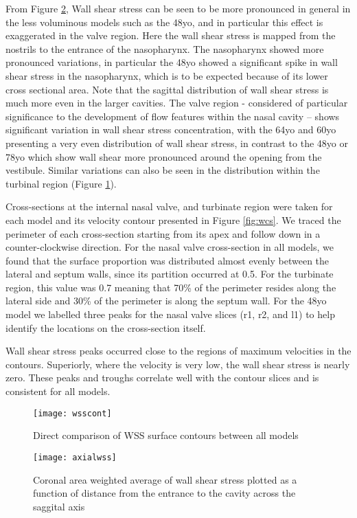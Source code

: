 From Figure \ref{fig:wax}, Wall shear stress can be seen to be more pronounced in general in the less voluminous models such as the 48yo, and in particular this effect is exaggerated in the valve region. Here the wall shear stress is mapped from the nostrils to the entrance of the nasopharynx. The nasopharynx showed more pronounced variations, in particular the 48yo showed a significant spike in wall shear stress in the nasopharynx, which is to be expected because of its lower cross sectional area. Note that the sagittal distribution of wall shear stress is much more even in the larger cavities.  The valve region - considered of particular significance to the development of flow features within the nasal cavity \cite{Lindemann2008} – shows significant variation in wall shear stress concentration, with the 64yo and 60yo presenting a very even distribution of wall shear stress, in contrast to the 48yo or 78yo which show wall shear more pronounced around the opening from the vestibule. Similar variations can also be seen in the distribution within the turbinal region (Figure \ref{fig:wcont}). 

Cross-sections at the internal nasal valve, and turbinate region were taken for each model and its velocity contour presented in Figure \ref{fig:wcs}. We traced the perimeter of each cross-section starting from its apex and follow down in a counter-clockwise direction. For the nasal valve cross-section in all models, we found that the surface proportion was distributed almost evenly between the lateral and septum walls, since its partition occurred at 0.5. For the turbinate region, this value was 0.7 meaning that 70\% of the perimeter resides along the lateral side and 30\% of the perimeter is along the septum wall. For the 48yo model we labelled three peaks for the nasal valve slices (r1, r2, and l1) to help identify the locations on the cross-section itself. 

Wall shear stress peaks occurred close to the regions of maximum velocities in the contours. Superiorly, where the velocity is very low, the wall shear stress is nearly zero. These peaks and troughs correlate well with the contour slices and is consistent for all models.

\begin{figure} 
  \texttt{[image: wsscont]}
  \caption{Direct comparison of WSS surface contours between all models}
    \label{fig:wcont}
\end{figure}

\begin{figure} 
  \texttt{[image: axialwss]}
  \caption{Coronal area weighted average of wall shear stress plotted as a function of distance from the entrance to the cavity across the saggital axis}
  \label{fig:wax}
\end{figure}


